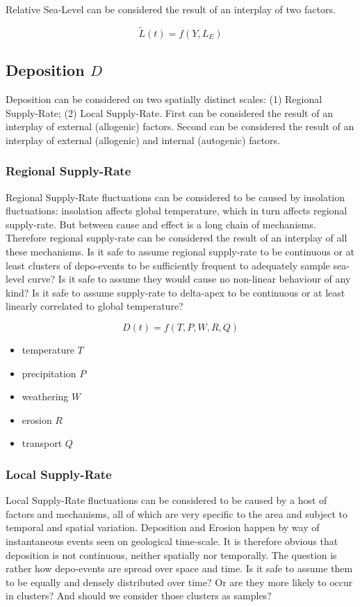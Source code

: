 \documentclass[12pt]{article}
\begin{document}
Relative Sea-Level can be considered the result of an interplay of two factors.

$$
\tilde{L}(t) = f(Y,L_E)
$$

\subsection*{Deposition $D$}

Deposition can be considered on two spatially distinct scales: (1) Regional Supply-Rate; (2) Local Supply-Rate. First can be considered the result of an interplay of external (allogenic) factors. Second can be considered the result of an interplay of external (allogenic) and internal (autogenic) factors.

\subsubsection*{Regional Supply-Rate}

Regional Supply-Rate fluctuations can be considered to be caused by insolation fluctuations: insolation affects global temperature, which in turn affects regional supply-rate. But between cause and effect is a long chain of mechanisms. Therefore regional supply-rate can be considered the result of an interplay of all these mechanisms. Is it safe to assume regional supply-rate to be continuous or at least clusters of depo-events to be sufficiently frequent to adequately sample sea-level curve? Is it safe to assume they would cause no non-linear behaviour of any kind? Is it safe to assume supply-rate to delta-apex to be continuous or at least linearly correlated to global temperature?

$$
D(t) = f(T,P,W,R,Q)
$$

\begin{itemize}
  \item temperature $T$
  \item precipitation $P$
  \item weathering $W$
  \item erosion $R$
  \item transport $Q$
\end{itemize}

\subsubsection*{Local Supply-Rate}

Local Supply-Rate fluctuations can be considered to be caused by a host of factors and mechanisms, all of which are very specific to the area and subject to temporal and spatial variation. Deposition and Erosion happen by way of instantaneous events seen on geological time-scale. It is therefore obvious that deposition is not continuous, neither spatially nor temporally. The question is rather how depo-events are spread over space and time. Is it safe to assume them to be equally and densely distributed over time? Or are they more likely to occur in clusters? And should we consider those clusters as samples?
\end{document}
